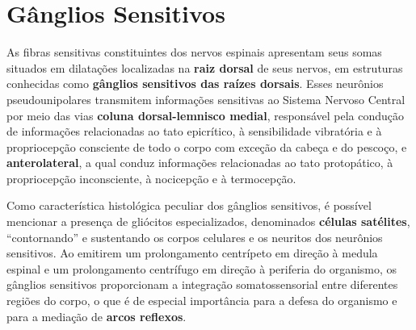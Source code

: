 \documentclass[
]{book}
\begin{document}
\hypertarget{guxe2nglios-sensitivos}{%
\section{Gânglios Sensitivos}\label{guxe2nglios-sensitivos}}

As fibras sensitivas constituintes dos nervos espinais apresentam seus somas situados em dilatações localizadas na \textbf{raiz dorsal} de seus nervos, em estruturas conhecidas como \textbf{gânglios sensitivos das raízes dorsais}. Esses neurônios pseudounipolares transmitem informações sensitivas ao Sistema Nervoso Central por meio das vias \textbf{coluna dorsal-lemnisco medial}, responsável pela condução de informações relacionadas ao tato epicrítico, à sensibilidade vibratória e à propriocepção consciente de todo o corpo com exceção da cabeça e do pescoço, e \textbf{anterolateral}, a qual conduz informações relacionadas ao tato protopático, à propriocepção inconsciente, à nocicepção e à termocepção.

Como característica histológica peculiar dos gânglios sensitivos, é possível mencionar a presença de gliócitos especializados, denominados \textbf{células satélites}, ``contornando'' e sustentando os corpos celulares e os neuritos dos neurônios sensitivos. Ao emitirem um prolongamento centrípeto em direção à medula espinal e um prolongamento centrífugo em direção à periferia do organismo, os gânglios sensitivos proporcionam a integração somatossensorial entre diferentes regiões do corpo, o que é de especial importância para a defesa do organismo e para a mediação de \textbf{arcos reflexos}.
\end{document}
